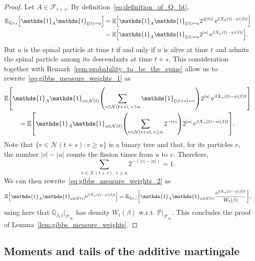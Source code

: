 \documentclass[10pt]{amsart}
\theoremstyle{definition}\newtheorem{defi}[theo]{Definition}\newtheorem{rema}[theo]{Remark}\newtheorem{exam}[theo]{Example}\newtheorem{exem}[theo]{Example}\newtheorem{nota}[theo]{Notation}
\newcommand{\e}{\mathrm{e}}
\newcommand{\E}{\mathbb{E}}
\renewcommand{\P}{\mathbb{P}}
\newcommand{\Q}{\mathbb{Q}}
\newcommand\1{\mathds{1}}
\newcommand{\cF}{\mathcal{F}}
\newcommand{\cN}{\mathcal{N}}
\let\originalleft\left
\let\originalright\right
\renewcommand{\left}{\mathopen{}\mathclose\bgroup\originalleft}
\renewcommand{\right}{\aftergroup\egroup\originalright}
\begin{document}
\begin{proof}
Let $A \in \cF_{t+s}$. By definition~\eqref{eq:definition_of_Q_bt},
\begin{equation}\label{eq:gibbs_measure_weights_1}
\begin{aligned}
\E_{\Q_{\beta, t}} \left[\1_A \1_{\xi(t) = u} \right] & = \E \left[\1_A \1_{\xi(t) = u} 2^{|\xi(t)|}\, \e^{\beta X_\xi(t) - \psi(\beta) t} \right] \\
& = \E \left[\1_A \1_{\xi(t) = u} 2^{|u|}\, \e^{\beta X_u(t) - \psi(\beta) t} \right]. 
\end{aligned}
\end{equation}
But $u$ is the spinal particle at time $t$ if and only if $u$ is alive at time $t$ and admits the spinal particle among its descendants at time $t + s$. This consideration together with Remark~\ref{rem:probability_to_be_the_spine} allow us to rewrite~\eqref{eq:gibbs_measure_weights_1} as
\begin{multline}\label{eq:gibbs_measure_weights_2}
\E \left[\1_A \1_{u \in \cN(t)} \left(\sum_{v \in \cN(t+s),\, v \geq u} \1_{\xi(t+s) = v}\right) 2^{|u|}\, \e^{\beta X_u(t) - \psi(\beta) t} \right] \\
 = \E \left[\1_A \1_{u \in \cN(t)} \left(\sum_{v \in \cN(t+s),\, v \geq u} 2^{-|v|} \right) 2^{|u|}\, \e^{\beta X_u(t) - \psi(\beta) t} \right].
\end{multline}
Note that $\{v \in \cN(t+s) : v \geq u\}$ is a binary tree and that, for its particles $v$, the number $|v| - |u|$ counts the fission times from $u$ to $v$. Therefore,
\begin{equation*}
\sum_{v \in \cN(t+s),\, v \geq u} 2^{-(|v| - |u|)} = 1.
\end{equation*}
We can then rewrite~\eqref{eq:gibbs_measure_weights_2} as
\begin{equation*}
\E \left[\1_A \1_{u \in \cN(t)} \e^{\beta X_u(t) - \psi(\beta) t} \right] = \E_{\Q_{\beta, t}} \left[\1_A \1_{u \in \cN(t)} \frac{\e^{\beta X_u(t) - \psi(\beta) t}}{W_t(\beta)} \right],
\end{equation*}
using here that $\Q_{\beta,t}|_{\cF_\infty}$ has density $W_t(\beta)$ w.r.t. $\P|_{\cF_\infty}$. This concludes the proof of Lemma~\ref{lem:gibbs_measure_weights}.
\end{proof}

\subsection{Moments and tails of the additive martingale}
\end{document}
